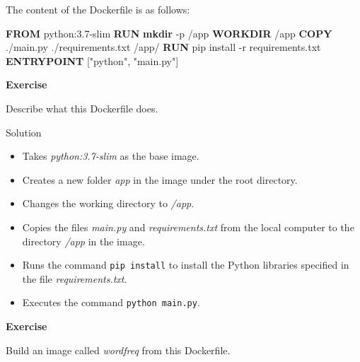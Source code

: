\documentclass[
]{article}
\newenvironment{Shaded}{\begin{snugshade}}{\end{snugshade}}
\newcommand{\AttributeTok}[1]{\textcolor[rgb]{0.13,0.29,0.53}{#1}}
\newcommand{\ExtensionTok}[1]{#1}
\newcommand{\FunctionTok}[1]{\textcolor[rgb]{0.13,0.29,0.53}{\textbf{#1}}}
\newcommand{\KeywordTok}[1]{\textcolor[rgb]{0.13,0.29,0.53}{\textbf{#1}}}
\newcommand{\NormalTok}[1]{#1}
\newcommand{\StringTok}[1]{\textcolor[rgb]{0.31,0.60,0.02}{#1}}
\providecommand{\tightlist}{%
  \setlength{\itemsep}{0pt}\setlength{\parskip}{0pt}}
\newenvironment{infobox}[1]
  {
  \begin{itemize}
  \renewcommand{\labelitemi}{
    \raisebox{-.7\height}[0pt][0pt]{
      
    }
  }
  \setlength{\fboxsep}{1em}
  \begin{whitebox}
  \item
  }
  {
  \end{whitebox}
  \end{itemize}
  }
\theoremstyle{definition}
\theoremstyle{definition}
\theoremstyle{definition}
\theoremstyle{remark}
\let\BeginKnitrBlock\begin \let\EndKnitrBlock\end
\begin{document}
The content of the Dockerfile is as follows:

\begin{Shaded}
\begin{Highlighting}[]
\KeywordTok{FROM}\NormalTok{ python:3.7{-}slim}
\KeywordTok{RUN} \FunctionTok{mkdir} \AttributeTok{{-}p}\NormalTok{ /app}
\KeywordTok{WORKDIR}\NormalTok{ /app}
\KeywordTok{COPY}\NormalTok{ ./main.py ./requirements.txt /app/}
\KeywordTok{RUN} \ExtensionTok{pip}\NormalTok{ install }\AttributeTok{{-}r}\NormalTok{ requirements.txt}
\KeywordTok{ENTRYPOINT}\NormalTok{ [}\StringTok{"python"}\NormalTok{, }\StringTok{"main.py"}\NormalTok{]}
\end{Highlighting}
\end{Shaded}

\begin{infobox}{exercisebox}

\textbf{Exercise}

\BeginKnitrBlock{exercise}
\label{exr:unnamed-chunk-19}{\label{exr:unnamed-chunk-19} }Describe what this Dockerfile does.
\EndKnitrBlock{exercise}

\end{infobox}

Solution

\begin{infobox}{exercisebox}

\begin{itemize}
\tightlist
\item
  Takes \emph{python:3.7-slim} as the base image.
\item
  Creates a new folder \emph{app} in the image under the root directory.
\item
  Changes the working directory to \emph{/app}.
\item
  Copies the files \emph{main.py} and \emph{requirements.txt} from the local
  computer to the directory \emph{/app} in the image.
\item
  Runs the command \texttt{pip\ install} to install the Python libraries
  specified in the file \emph{requirements.txt}.
\item
  Executes the command \texttt{python\ main.py}.
\end{itemize}

\end{infobox}

\textbf{Exercise}

\BeginKnitrBlock{exercise}
\label{exr:unnamed-chunk-20}{\label{exr:unnamed-chunk-20} }Build an image called \emph{wordfreq} from this Dockerfile.
\EndKnitrBlock{exercise}
\end{document}
